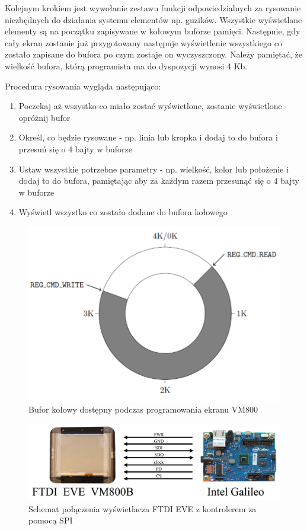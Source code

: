\documentclass{xmgr}
\begin{document}
Kolejnym krokiem jest wywołanie zestawu funkcji odpowiedzialnych za rysowanie niezbędnych do działania systemu elementów np. guzików. Wszystkie wyświetlane elementy są na początku zapisywane w kołowym buforze pamięci. Następnie, gdy cały ekran zostanie już przygotowany następuje wyświetlenie wszystkiego co zostało zapisane do bufora po czym zostaje on wyczyszczony. Należy pamiętać, że wielkość bufora, którą programista ma do dyspozycji wynosi 4 Kb.

Procedura rysowania wygląda następująco:
\begin{enumerate}
	\item Poczekaj aż wszystko co miało zostać wyświetlone, zostanie wyświetlone - opróżnij bufor
	\item Określ, co będzie rysowane - np. linia lub kropka i dodaj to do bufora i przesuń się o 4 bajty w buforze
	\item Ustaw wszystkie potrzebne parametry - np. wielkość, kolor lub położenie i dodaj to do bufora, pamiętając aby za każdym razem przesunąć się o 4 bajty w buforze
	\item Wyświetl wszystko co zostało dodane do bufora kołowego 
\end{enumerate}

\begin{figure}[!h]
    \centering
    \includegraphics[height=0.15\textheight]{images/buf.png}
    \caption{Bufor kołowy dostępny podczas programowania ekranu VM800}
\end{figure}

\begin{figure}[!h]
    \centering
    \includegraphics[height=0.17\textheight]{images/ekranGalileo.jpg}
    \caption{Schemat połączenia wyświetlacza FTDI EVE z kontrolerem za pomocą SPI}
\end{figure}
\end{document}
